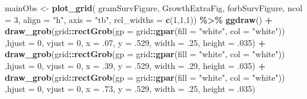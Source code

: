\documentclass[
]{article}
\newenvironment{Shaded}{\begin{snugshade}}{\end{snugshade}}
\newcommand{\DataTypeTok}[1]{\textcolor[rgb]{0.13,0.29,0.53}{#1}}
\newcommand{\DecValTok}[1]{\textcolor[rgb]{0.00,0.00,0.81}{#1}}
\newcommand{\FloatTok}[1]{\textcolor[rgb]{0.00,0.00,0.81}{#1}}
\newcommand{\KeywordTok}[1]{\textcolor[rgb]{0.13,0.29,0.53}{\textbf{#1}}}
\newcommand{\NormalTok}[1]{#1}
\newcommand{\OperatorTok}[1]{\textcolor[rgb]{0.81,0.36,0.00}{\textbf{#1}}}
\newcommand{\StringTok}[1]{\textcolor[rgb]{0.31,0.60,0.02}{#1}}
\begin{document}
\begin{Shaded}
\begin{Highlighting}[]
\NormalTok{mainObs \textless{}{-}}\StringTok{ }\KeywordTok{plot\_grid}\NormalTok{( gramSurvFigure, GrowthExtraFig, forbSurvFigure, }\DataTypeTok{ncol =} \DecValTok{3}\NormalTok{, }\DataTypeTok{align =} \StringTok{"h"}\NormalTok{, }\DataTypeTok{axis =} \StringTok{"tb"}\NormalTok{, }\DataTypeTok{rel\_widths =} \KeywordTok{c}\NormalTok{(}\DecValTok{1}\NormalTok{,}\DecValTok{1}\NormalTok{,}\DecValTok{1}\NormalTok{)) }\OperatorTok{\%\textgreater{}\%}\StringTok{ }
\StringTok{  }\KeywordTok{ggdraw}\NormalTok{() }\OperatorTok{+}\StringTok{ }\KeywordTok{draw\_grob}\NormalTok{(grid}\OperatorTok{::}\KeywordTok{rectGrob}\NormalTok{(}\DataTypeTok{gp =}\NormalTok{ grid}\OperatorTok{::}\KeywordTok{gpar}\NormalTok{(}\DataTypeTok{fill =} \StringTok{"white"}\NormalTok{, }\DataTypeTok{col =} \StringTok{"white"}\NormalTok{)) ,}\DataTypeTok{hjust =} \DecValTok{0}\NormalTok{, }\DataTypeTok{vjust =} \DecValTok{0}\NormalTok{, }\DataTypeTok{x =} \FloatTok{.07}\NormalTok{, }\DataTypeTok{y =} \FloatTok{.529}\NormalTok{, }\DataTypeTok{width =} \FloatTok{.25}\NormalTok{, }\DataTypeTok{height =} \FloatTok{.035}\NormalTok{) }\OperatorTok{+}
\StringTok{  }\KeywordTok{draw\_grob}\NormalTok{(grid}\OperatorTok{::}\KeywordTok{rectGrob}\NormalTok{(}\DataTypeTok{gp =}\NormalTok{ grid}\OperatorTok{::}\KeywordTok{gpar}\NormalTok{(}\DataTypeTok{fill =} \StringTok{"white"}\NormalTok{, }\DataTypeTok{col =} \StringTok{"white"}\NormalTok{)) ,}\DataTypeTok{hjust =} \DecValTok{0}\NormalTok{, }\DataTypeTok{vjust =} \DecValTok{0}\NormalTok{, }\DataTypeTok{x =} \FloatTok{.39}\NormalTok{, }\DataTypeTok{y =} \FloatTok{.529}\NormalTok{, }\DataTypeTok{width =} \FloatTok{.29}\NormalTok{, }\DataTypeTok{height =} \FloatTok{.035}\NormalTok{) }\OperatorTok{+}
\StringTok{  }\KeywordTok{draw\_grob}\NormalTok{(grid}\OperatorTok{::}\KeywordTok{rectGrob}\NormalTok{(}\DataTypeTok{gp =}\NormalTok{ grid}\OperatorTok{::}\KeywordTok{gpar}\NormalTok{(}\DataTypeTok{fill =} \StringTok{"white"}\NormalTok{, }\DataTypeTok{col =} \StringTok{"white"}\NormalTok{)) ,}\DataTypeTok{hjust =} \DecValTok{0}\NormalTok{, }\DataTypeTok{vjust =} \DecValTok{0}\NormalTok{, }\DataTypeTok{x =} \FloatTok{.73}\NormalTok{, }\DataTypeTok{y =} \FloatTok{.529}\NormalTok{, }\DataTypeTok{width =} \FloatTok{.25}\NormalTok{, }\DataTypeTok{height =} \FloatTok{.035}\NormalTok{)}


\end{Highlighting}
\end{Shaded}
\end{document}
